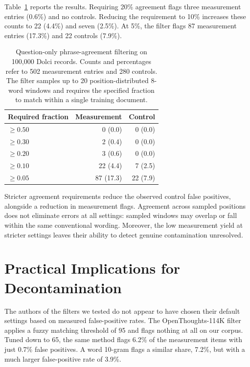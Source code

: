 \documentclass[11pt]{article}
\begin{document}
Table~\ref{tab:phrase-agreement} reports the results. Requiring 20\% agreement flags three measurement entries (0.6\%) and no controls. Reducing the requirement to 10\% increases these counts to 22 (4.4\%) and seven (2.5\%). At 5\%, the filter flags 87 measurement entries (17.3\%) and 22 controls (7.9\%).

\begin{table}[t]
\centering
\small
\setlength{\tabcolsep}{5pt}
\begin{tabular}{@{}lrr@{}}
\toprule
Required fraction & Measurement & Control \\
\midrule
$\geq 0.50$ & 0 (0.0)   & 0 (0.0) \\
$\geq 0.30$ & 2 (0.4)   & 0 (0.0) \\
$\geq 0.20$ & 3 (0.6)   & 0 (0.0) \\
$\geq 0.10$ & 22 (4.4)  & 7 (2.5) \\
$\geq 0.05$ & 87 (17.3) & 22 (7.9) \\
\bottomrule
\end{tabular}
\caption{Question-only phrase-agreement filtering on
100,000 Dolci records. Counts and percentages refer
to 502 measurement entries and 280 controls.
The filter samples up to 20 position-distributed
8-word windows and requires the specified fraction
to match within a single training document.}
\label{tab:phrase-agreement}
\end{table}

Stricter agreement requirements reduce the observed control false positives, alongside a reduction in measurement flags. Agreement across sampled positions does not eliminate errors at all settings: sampled windows may overlap or fall within the same conventional wording. Moreover, the low measurement yield at stricter settings leaves their ability to detect genuine contamination unresolved.

\section{Practical Implications for Decontamination}
\label{sec:practice}

The authors of the filters we tested do not appear to have chosen their default settings based on measured false-positive rates. The OpenThoughts-114K filter applies a fuzzy matching threshold of 95 and flags nothing at all on our corpus. Tuned down to 65, the same method flags 6.2\% of the measurement items with just 0.7\% false positives. A word 10-gram flags a similar share, 7.2\%, but with a much larger false-positive rate of 3.9\%.
\end{document}
